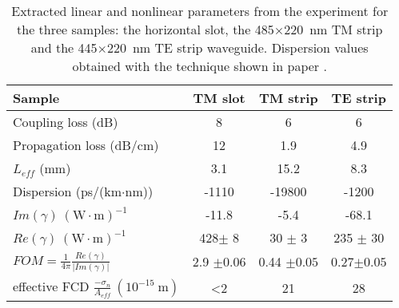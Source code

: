  \begin{table}[htb]
                        \centering
                        \caption{Extracted linear and nonlinear parameters from the experiment for the three samples: the horizontal slot, the  485$\times$220~nm TM strip and the  445$\times$220~nm TE strip waveguide. Dispersion values obtained with the technique shown in paper \cite{Mas2012}.}
                                \begin{tabular}{l|ccc}
                                        \hline
                                        Sample & TM slot & TM strip & TE strip\\\hline
                                        Coupling loss (dB) & 8 & 6 & 6\\
                                        Propagation loss (dB/cm) & 12 & 1.9 & 4.9\\
                                        $L_{eff}$ (mm) & 3.1 & 15.2 & 8.3\\
                                        Dispersion  (ps/(km$\cdot$nm))  & -1110 & -19800 & -1200\\
                                        $ Im(\gamma)~(\mathrm{W}\cdot \mathrm{m})^{-1} $          & -11.8 & -5.4 & -68.1\\
                                        $ Re(\gamma)~(\mathrm{W}\cdot \mathrm{m})^{-1} $          & 428$\pm$ 8 & 30 $\pm$ 3 & 235 $\pm$ 30\\
                                        $ FOM = \frac{1}{4\pi} \frac{Re(\gamma)}{|Im(\gamma)|} $  & 2.9 $\pm 0.06$ & 0.44 $\pm 0.05$ & 0.27$\pm 0.05$ \\
                                        effective FCD $ \frac{-\sigma_n}{ A_{eff} }~(10^{-15}~\mathrm{m}) $  & \textless 2 & 21 & 28 \\
                                        \hline
                                \end{tabular} 
\label{tab:resultsArticleSlot}
\end{table}



